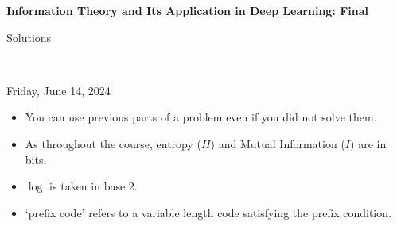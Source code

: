 \documentclass[12pt]{article}
\begin{document}
\begin{center}
{\bf Information Theory and Its Application in Deep Learning: Final\begin{solution}Solutions\end{solution}} \\ \medskip
\begin{problem}Friday, June 14, 2024 \end{problem}
\end{center}

\begin{problem}
\noindent 
\begin{itemize}
\item You can use previous parts of a problem even if you did not solve them.
\item As throughout the course, entropy ($H$) and Mutual Information ($I$) are in bits.
\item $\log$ is taken in base 2. 
\item `prefix code' refers to a variable length code satisfying the prefix condition.  
\end{itemize}
\end{problem}

\begin{solution}
\end{solution}

\end{document}

